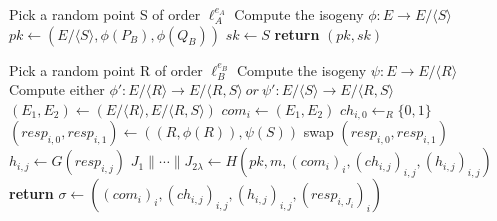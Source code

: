 \documentclass[12pt,a4paper]{article}
\begin{document}

\begin{algorithm}\label{algorithm_3}
	\caption{ $ KeyGen(\lambda) $}
	\begin{algorithmic}[1]
		\State Pick a random point S of order $\ell_A^{e_A}$
		\State Compute the isogeny $\phi : E \rightarrow E / \langle S \rangle $
		\State $ pk \leftarrow (E / \langle S \rangle , \phi(P_B) , \phi(Q_B)) $
		\State $sk \leftarrow S$
		\State \textbf{return} $(pk,sk)$
		
	\end{algorithmic}
\end{algorithm}


\begin{algorithm}\label{algorithm_4}
	\caption{ $ Sign(sk,m)$ }
	\begin{algorithmic}[1]
		\State Pick a random point R of order $\ell_B^{e_B}$
		\State Compute the isogeny $\psi : E \rightarrow E / \langle R \rangle $
		\State Compute either $ {\phi}' : E / \langle R \rangle \rightarrow E / \langle R ,S \rangle \ or \  {\psi}' : E / \langle S \rangle \rightarrow E / \langle R ,S \rangle $
		\State $(E_1,E_2) \leftarrow (E / \langle R \rangle , E / \langle R,S \rangle ) $
		\State $ com_i \leftarrow (E_1 , E_2 ) $
		\State $ch_{i,0} \leftarrow_{R} \{ 0,1\}$
		\State $ (resp_{i,0} , resp_{i,1}) \leftarrow ((R,\phi(R)) , \psi(S) ) $
		\State swap $ (resp_{i,0} , resp_{i,1})$
		\EndIf 
		\State $h_{i,j} \leftarrow G(resp_{i,j})$
		\EndFor 
		\State $J_1 \parallel \cdots \parallel J_{2\lambda}  \leftarrow H( pk,m,(com_i)_i , (ch_{i,j})_{i,j} , (h_{i,j})_{i,j} )$
		\State \textbf{return} $ \sigma \leftarrow ( (com_i)_i , (ch_{i,j})_{i,j} , (h_{i,j})_{i,j} , (resp_{i,J_i})_i ) $
		
	\end{algorithmic}
\end{algorithm}
\end{document}

